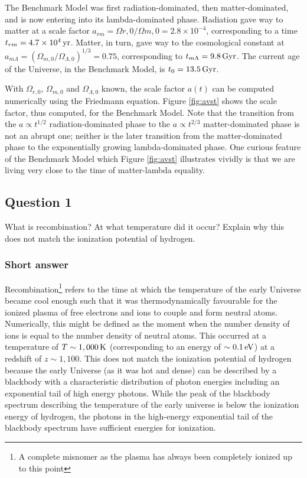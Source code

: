 \documentclass[a4paper,11pt]{article}
\begin{document}
{\noindent}The Benchmark Model was first radiation-dominated, then matter-dominated, and is now entering into its lambda-dominated phase. Radiation gave way to matter at a scale factor $a_{rm}=\Omega{r,0}/\Omega{m,0}=2.8\times10^{-4}$, corresponding to a time $t_{rm}=4.7\times10^4\,{\rm yr}$. Matter, in turn, gave way to the cosmological constant at $a_{m\Lambda}=(\Omega_{m,0}/\Omega_{\Lambda,0})^{1/3}=0.75$, corresponding to $t_{m\Lambda}=9.8\,{\rm Gyr}$. The current age of the Universe, in the Benchmark Model, is $t_0=13.5\,{\rm Gyr}$.

{\noindent}With $\Omega_{r,0}$, $\Omega_{m,0}$ and $\Omega_{\Lambda,0}$ known, the scale factor $a(t)$ can be computed numerically using the Friedmann equation. Figure \ref{fig:avst} shows the scale factor, thus computed, for the Benchmark Model. Note that the transition from the $a\propto t^{1/2}$ radiation-dominated phase to the $a\propto t^{2/3}$ matter-dominated phase is not an abrupt one; neither is the later transition from the matter-dominated phase to the exponentially growing lambda-dominated phase. One curious feature of the Benchmark Model which Figure \ref{fig:avst} illustrates vividly is that we are living very close to the time of matter-lambda equality.


%
%

\newpage
\subsection{Question 1}

What is recombination? At what temperature did it occur? Explain why this does not match the ionization potential of hydrogen.

\subsubsection{Short answer}

Recombination\footnote{A complete misnomer as the plasma has always been completely ionized up to this point} refers to the time at which the temperature of the early Universe became cool enough such that it was thermodynamically favourable for the ionized plasma of free electrons and ions to couple and form neutral atoms. Numerically, this might be defined as the moment when the number density of ions is equal to the number density of neutral atoms. This occurred at a temperature of $T \sim 1,000\,{\rm K}$ (corresponding to an energy of $\sim 0.1\,{\rm eV}$) at a redshift of $z \sim 1,100$. This does not match the ionization potential of hydrogen because the early Universe (as it was hot and dense) can be described by a blackbody with a characteristic distribution of photon energies including an exponential tail of high energy photons. While the peak of the blackbody spectrum describing the temperature of the early universe is below the ionization energy of hydrogen, the photons in the high-energy exponential tail of the blackbody spectrum have sufficient energies for ionization.
\end{document}
